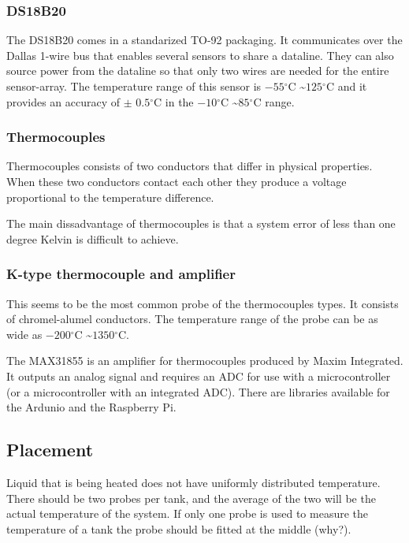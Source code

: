 \documentclass[11pt,fleqn,openany]{book} %
\newcommand{\degree}{\ensuremath{^\circ}}
\begin{document}
\subsubsection{DS18B20}

The DS18B20 comes in a standarized TO-92 packaging. It communicates over the Dallas 1-wire bus that enables several sensors to share a dataline. They can also source power from the dataline so that only two wires are needed for the entire sensor-array.
The temperature range of this sensor is $-55\degree$C \textasciitilde $125\degree$C and it provides an accuracy of $\pm$ $0.5\degree$C in the $-10\degree$C \textasciitilde $85\degree$C range.

\subsubsection{Thermocouples}

Thermocouples consists of two conductors that differ in physical properties. When these two conductors contact each other they produce a voltage proportional to the temperature difference.

The main dissadvantage of thermocouples is that a system error of less than one degree Kelvin is difficult to achieve.

\subsubsection{K-type thermocouple and amplifier}

This seems to be the most common probe of the thermocouples types. It consists of chromel-alumel conductors. The temperature range of the probe can be as wide as $-200\degree$C \textasciitilde $1350\degree$C.

The MAX31855 is an amplifier for thermocouples produced by Maxim Integrated. It outputs an analog signal and requires an ADC for use with a microcontroller (or a microcontroller with an integrated ADC). There are libraries available for the Ardunio and the Raspberry Pi. 

\subsection{Placement}

Liquid that is being heated does not have uniformly distributed temperature. There should be two probes per tank, and the average of the two will be the actual temperature of the system.
If only one probe is used to measure the temperature of a tank the probe should be fitted at the middle (why?).
\end{document}
